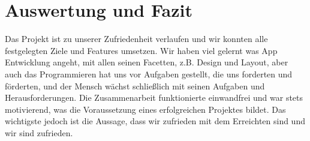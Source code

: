 \section{Auswertung und Fazit}  %
Das Projekt ist zu unserer Zufriedenheit verlaufen und wir konnten alle festgelegten
Ziele und Features umsetzen. Wir haben viel gelernt was App Entwicklung angeht, mit
allen seinen Facetten, z.B. Design und Layout, aber auch das Programmieren hat uns
vor Aufgaben gestellt, die uns forderten und förderten, und der Mensch wächst schließlich
mit seinen Aufgaben und Herausforderungen. Die Zusammenarbeit funktionierte einwandfrei
und war stets motivierend, was die Voraussetzung eines erfolgreichen Projektes bildet.
Das wichtigste jedoch ist die Aussage, dass wir zufrieden mit dem Erreichten sind
und wir sind zufrieden.



\appendix
\printbibliography[heading=bibintoc,title={Quellenverzeichnis}]
\listoffigures


